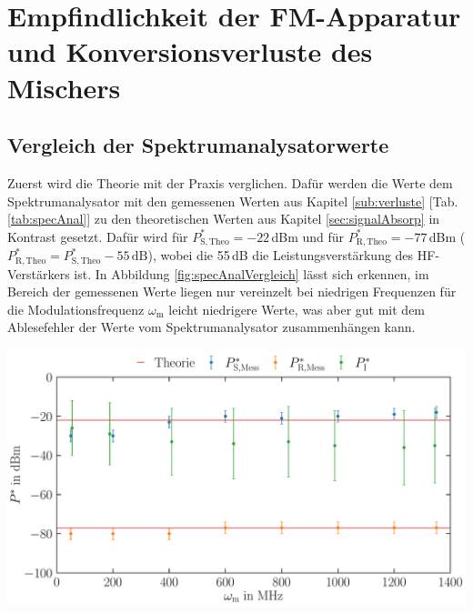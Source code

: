 
\section{Empfindlichkeit der FM-Apparatur und Konversionsverluste des Mischers}
\label{sec:verlusteAuswertung}

\subsection{Vergleich der Spektrumanalysatorwerte}
\label{sub:specAnalVergleich}

Zuerst wird die Theorie mit der Praxis verglichen. Dafür werden die Werte dem Spektrumanalysator mit den gemessenen Werten aus Kapitel \ref{sub:verluste} [Tab. \ref{tab:specAnal}] zu den theoretischen Werten aus Kapitel \ref{sec:signalAbsorp} in Kontrast gesetzt. Dafür wird für $P^*_\mathrm{S,Theo} = -22$\,dBm und für $P^*_\mathrm{R,Theo}= -77$\,dBm ($P^*_\mathrm{R,Theo} = P^*_\mathrm{S,Theo} - 55\,\mathrm{dB}$), wobei die 55\,dB die Leistungsverstärkung des HF-Verstärkers ist. In Abbildung \ref{fig:specAnalVergleich} lässt sich erkennen, im Bereich der gemessenen Werte liegen nur vereinzelt bei niedrigen Frequenzen für die Modulationsfrequenz $\omega_\mathrm{m}$ leicht niedrigere Werte, was aber gut mit dem Ablesefehler der Werte vom Spektrumanalysator zusammenhängen kann.
\begin{center}
    \captionsetup{type=figure}
    \includegraphics[scale=0.35]{Bilder/Auswertung/62/Signal-Rausch.pdf}
    \label{fig:specAnalVergleich}
\end{center}


